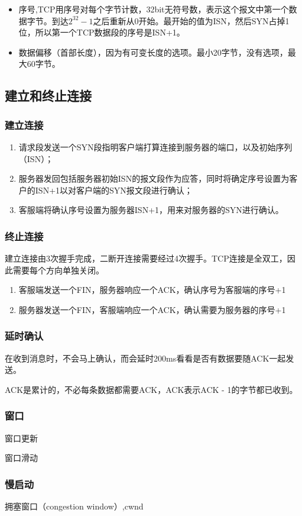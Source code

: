 \begin{itemize}
\item 序号,TCP用序号对每个字节计数，32bit无符号数，表示这个报文中第一个数据字节。到达$2^{32} - 1$之后重新从0开始。最开始的值为ISN，然后SYN占掉1位，所以第一个TCP数据段的序号是ISN+1。

\item 数据偏移（首部长度），因为有可变长度的选项。最小20字节，没有选项，最大60字节。

\end{itemize}

\subsection{建立和终止连接}

\subsubsection{建立连接}

\begin{enumerate}
\item 请求段发送一个SYN段指明客户端打算连接到服务器的端口，以及初始序列（ISN）；

\item 服务器发回包括服务器初始ISN的报文段作为应答，同时将确定序号设置为客户的ISN+1以对客户端的SYN报文段进行确认；

\item 客服端将确认序号设置为服务器ISN+1，用来对服务器的SYN进行确认。

\end{enumerate}

\subsubsection{终止连接}

建立连接由3次握手完成，二断开连接需要经过4次握手。TCP连接是全双工，因此需要每个方向单独关闭。

\begin{enumerate}
\item 客服端发送一个FIN，服务器响应一个ACK，确认序号为客服端的序号+1

\item 服务器发送一个FIN，客服端响应一个ACK，确认需要为服务器的序号+1
\end{enumerate}

\subsubsection{延时确认}

在收到消息时，不会马上确认，而会延时200ms看看是否有数据要随ACK一起发送。

ACK是累计的，不必每条数据都需要ACK，ACK表示ACK - 1的字节都已收到。

\subsubsection{窗口}

窗口更新

窗口滑动

\subsubsection{慢启动}

拥塞窗口（congestion window）,cwnd




